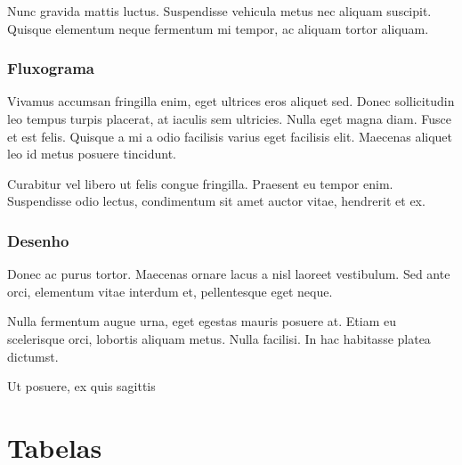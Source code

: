 \documentclass{uecetex2}
\begin{document}
	
	
	Nunc gravida mattis luctus. Suspendisse vehicula metus nec aliquam suscipit. Quisque elementum neque fermentum mi tempor, ac aliquam tortor aliquam.
	
	\subsubsection{Fluxograma}
	
	Vivamus accumsan fringilla enim, eget ultrices eros aliquet sed. Donec sollicitudin leo tempus turpis placerat, at iaculis sem ultricies. Nulla eget magna diam. Fusce et est felis. Quisque a mi a odio facilisis varius eget facilisis elit. Maecenas aliquet leo id metus posuere tincidunt.
	
	

	Curabitur vel libero ut felis congue fringilla. Praesent eu tempor enim. Suspendisse odio lectus, condimentum sit amet auctor vitae, hendrerit et ex.

	\subsubsection{Desenho}
	
	Donec ac purus tortor. Maecenas ornare lacus a nisl laoreet vestibulum. Sed ante orci, elementum vitae interdum et, pellentesque eget neque.
	
	
	
	Nulla fermentum augue urna, eget egestas mauris posuere at. Etiam eu scelerisque orci, lobortis aliquam metus. Nulla facilisi. In hac habitasse platea dictumst. 
	
	

	\blindtext
	
	\begin{figura}[h!]
		\centering
		\caption{\label{des:example-1} Ut posuere, ex quis sagittis}	
	\end{figura}

\blindtext

\begin{figura}[h!]
	\centering
\end{figura}

\blindtext

\section{Tabelas}
\end{document}

